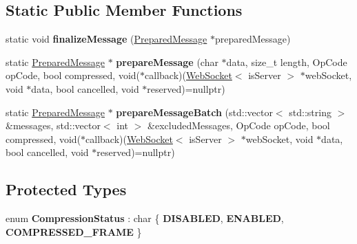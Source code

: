 \subsection*{Static Public Member Functions}
\begin{DoxyCompactItemize}
\item 
\mbox{\label{structu_w_s_1_1_web_socket_a92209f53234a84b326f3e58cdd029a7a}} 
static void {\bfseries finalize\+Message} (\mbox{\hyperlink{structu_w_s_1_1_web_socket_1_1_prepared_message}{Prepared\+Message}} $\ast$prepared\+Message)
\item 
\mbox{\label{structu_w_s_1_1_web_socket_af57c28b7a655f112eed1d295ebe718d9}} 
static \mbox{\hyperlink{structu_w_s_1_1_web_socket_1_1_prepared_message}{Prepared\+Message}} $\ast$ {\bfseries prepare\+Message} (char $\ast$data, size\+\_\+t length, Op\+Code op\+Code, bool compressed, void($\ast$callback)(\mbox{\hyperlink{structu_w_s_1_1_web_socket}{Web\+Socket}}$<$ is\+Server $>$ $\ast$web\+Socket, void $\ast$data, bool cancelled, void $\ast$reserved)=nullptr)
\item 
\mbox{\label{structu_w_s_1_1_web_socket_a7ed175a5270b2b213b4be76be291e71e}} 
static \mbox{\hyperlink{structu_w_s_1_1_web_socket_1_1_prepared_message}{Prepared\+Message}} $\ast$ {\bfseries prepare\+Message\+Batch} (std\+::vector$<$ std\+::string $>$ \&messages, std\+::vector$<$ int $>$ \&excluded\+Messages, Op\+Code op\+Code, bool compressed, void($\ast$callback)(\mbox{\hyperlink{structu_w_s_1_1_web_socket}{Web\+Socket}}$<$ is\+Server $>$ $\ast$web\+Socket, void $\ast$data, bool cancelled, void $\ast$reserved)=nullptr)
\end{DoxyCompactItemize}
\subsection*{Protected Types}
\begin{DoxyCompactItemize}
\item 
\mbox{\label{structu_w_s_1_1_web_socket_a48b8c02c020918efad93ae4ae2d79c41}} 
enum {\bfseries Compression\+Status} \+: char \{ {\bfseries D\+I\+S\+A\+B\+L\+ED}, 
{\bfseries E\+N\+A\+B\+L\+ED}, 
{\bfseries C\+O\+M\+P\+R\+E\+S\+S\+E\+D\+\_\+\+F\+R\+A\+ME}
 \}
\end{DoxyCompactItemize}
